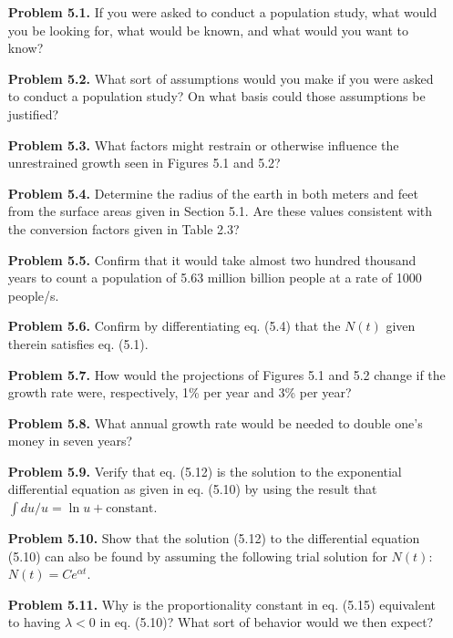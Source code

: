 \begin{enumerate}
    \item[\textbf{Problem 5.1.}] If you were asked to conduct a population study, what would you be looking for, what would be known, and what would you want to know?

    \item[\textbf{Problem 5.2.}] What sort of assumptions would you make if you were asked to conduct a population study? On what basis could those assumptions be justified?

    \item[\textbf{Problem 5.3.}] What factors might restrain or otherwise influence the unrestrained growth seen in Figures 5.1 and 5.2?

    \item[\textbf{Problem 5.4.}] Determine the radius of the earth in both meters and feet from the surface areas given in Section 5.1. Are these values consistent with the conversion factors given in Table 2.3?

    \item[\textbf{Problem 5.5.}] Confirm that it would take almost two hundred thousand years to count a population of 5.63 million billion people at a rate of 1000 people/s.

    \item[\textbf{Problem 5.6.}] Confirm by differentiating eq. (5.4) that the $N(t)$ given therein satisfies eq. (5.1).

    \item[\textbf{Problem 5.7.}] How would the projections of Figures 5.1 and 5.2 change if the growth rate were, respectively, 1\% per year and 3\% per year?

    \item[\textbf{Problem 5.8.}] What annual growth rate would be needed to double one's money in seven years?

    \item[\textbf{Problem 5.9.}] Verify that eq. (5.12) is the solution to the exponential differential equation as given in eq. (5.10) by using the result that $\int du/u = \ln u + \text{constant}$.

    \item[\textbf{Problem 5.10.}] Show that the solution (5.12) to the differential equation (5.10) can also be found by assuming the following trial solution for $N(t)$: $N(t) = Ce^{\alpha t}$.

    \item[\textbf{Problem 5.11.}] Why is the proportionality constant in eq. (5.15) equivalent to having $\lambda < 0$ in eq. (5.10)? What sort of behavior would we then expect?


\end{enumerate}
